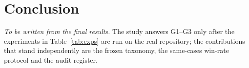 \section{Conclusion}
\emph{To be written from the final results.} The study answers G1--G3 only after the experiments in Table~\ref{tab:exps} are run on the real repository; the contributions that stand independently are the frozen taxonomy, the same-cases win-rate protocol and the audit register.
